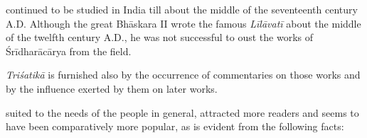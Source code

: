 \documentclass[10pt, openany]{book}
\begin{document}
\vspace{0.3cm}{The above references show that Śrīdharācārya's works}
{continued to be studied in India till about the middle of the}
{seventeenth century A.D. Although the great Bhāskara II}
{wrote the famous\textit{ Līlāvatī} about the middle of the twelfth}
{century A.D., he was not successful to oust the works of}
{Śrīdharācārya from the field.}

\textit{Triśatikā} is furnished also by the occurrence of commentaries on 
{those works and by the influence exerted by them on later works.}

\newpage

{suited to the needs of the people in general, attracted more}
{readers and seems to have been comparatively more popular,}
{as is evident from the following facts:}
\end{document}
